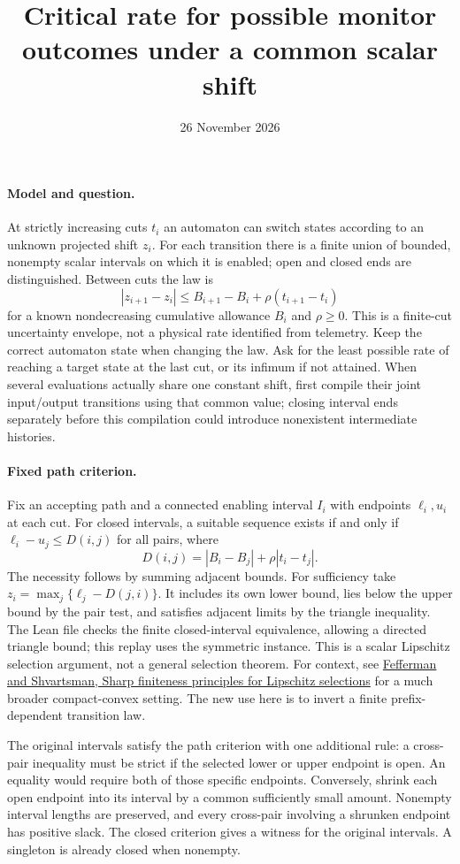 \documentclass[11pt]{article}
\title{Critical rate for possible monitor outcomes under a common scalar shift}
\date{26 November 2026}
\begin{document}
\maketitle

\paragraph{Model and question.}
At strictly increasing cuts $t_i$ an automaton can switch states
according to an unknown projected shift $z_i$. For each transition
there is a finite union of bounded, nonempty scalar intervals on
which it is enabled; open and closed ends are distinguished.
Between cuts the law is
\[
 |z_{i+1}-z_i|\le B_{i+1}-B_i+\rho(t_{i+1}-t_i)
\]
for a known nondecreasing cumulative allowance $B_i$ and $\rho\ge0$.
This is a finite-cut uncertainty envelope, not a physical rate
identified from telemetry. Keep the correct automaton state when
changing the law. Ask for the least possible rate of reaching a
target state at the last cut, or its infimum if not attained.
When several evaluations actually share one constant shift, first
compile their joint input/output transitions using that common
value; closing interval ends separately before this compilation
could introduce nonexistent intermediate histories.

\paragraph{Fixed path criterion.}
Fix an accepting path and a connected enabling interval
$I_i$ with endpoints $\ell_i,u_i$ at each cut. For closed intervals,
a suitable sequence exists if and only if
$\ell_i-u_j\le D(i,j)$ for all pairs, where
\[
 D(i,j)=|B_i-B_j|+\rho |t_i-t_j|.
\]
The necessity follows by summing adjacent bounds. For sufficiency
take $z_i=\max_j\{\ell_j-D(j,i)\}$. It includes its own lower bound,
lies below the upper bound by the pair test, and satisfies adjacent
limits by the triangle inequality. The Lean file checks the finite
closed-interval equivalence, allowing a directed triangle bound;
this replay uses the symmetric instance. This is a scalar
Lipschitz selection argument, not a general selection theorem.
For context, see \href{https://arxiv.org/abs/1801.00325}{Fefferman
and Shvartsman, Sharp finiteness principles for Lipschitz selections}
for a much broader compact-convex setting. The new use here is
to invert a finite prefix-dependent transition law.

The original intervals satisfy the path criterion with one additional
rule: a cross-pair inequality must be strict if the selected lower
or upper endpoint is open. An equality would require both of those
specific endpoints. Conversely, shrink each open endpoint into its
interval by a common sufficiently small amount. Nonempty interval
lengths are preserved, and every cross-pair involving a shrunken
endpoint has positive slack. The closed criterion gives a witness
for the original intervals. A singleton is already closed when nonempty.
\end{document}
